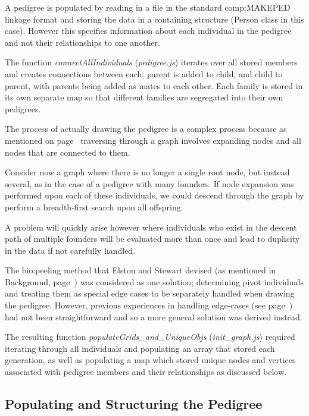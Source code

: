 A pedigree is populated by reading in a file in the standard \gls{comp:MAKEPED} linkage format and storing the data in a containing structure (Person class in this case). However this specifies information about each individual in the pedigree and not their relationships to one another.

The function \textit{connectAllIndividuals} (\textit{pedigree.js}) iterates over all stored members and creates connections between each: parent is added to child, and child to parent, with parents being added as mates to each other. Each family is stored in its own separate map so that different families are segregated into their own pedigrees. 

The process of actually drawing the pedigree is a complex process because as mentioned on page~\pageref{ref:haplo:graphtrav} traversing through a graph involves expanding nodes and all nodes that are connected to them.

Consider now a graph where there is no longer a single root node, but instead several, as in the case of a pedigree with many founders. If node expansion was performed upon each of these individuals, we could descend through the graph by perform a breadth-first search upon all offspring. 

A problem will quickly arise however where individuals who exist in the descent path of multiple founders will be evaluated more than once and lead to duplicity in the data if not carefully handled.

The \gls{bio:peeling} method that Elston and Stewart devised (as mentioned in Background, page~\pageref{ref:back:els}) was considered as one solution; determining pivot individuals and treating them as special edge cases to be separately handled when drawing the pedigree. However, previous experiences in handling edge-cases (see page~\pageref{ref:haplo:eventdiscuss}) had not been straightforward and so a more general solution was derived instead.

The resulting function \textit{populateGrids\_and\_UniqueObjs} (\textit{init\_graph.js}) required iterating through all individuals and populating an array that stored each generation, as well as populating a map which stored unique nodes and vertices associated with pedigree members and their relationships as discussed below.


\subsection{Populating and Structuring the Pedigree}


